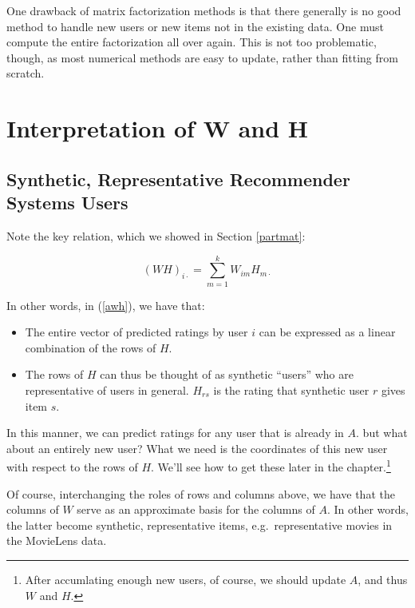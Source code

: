 One drawback of matrix factorization methods is that there generally is
no good method to handle new users or new items not in the existing
data.  One must compute the entire factorization all over again.  This
is not too problematic, though, as most numerical methods are easy to
update, rather than fitting from scratch.

\section{Interpretation of W and H}

\subsection{Synthetic, Representative Recommender Systems Users}
\label{synth}

Note the key relation, which we showed in Section \ref{partmat}:

\begin{equation}
(WH)_{i \cdot} = \sum_{m=1}^k W_{im} H_{m \cdot}
\end{equation}

In other words, in (\ref{awh}), we have that:

\begin{itemize}

\item The entire vector of predicted ratings by user $i$ can be
expressed as a linear combination of the rows of $H$.


\item The rows of $H$ can thus be thought of as synthetic
``users'' who are representative of users in general.  $H_{rs}$ is the
rating that synthetic user $r$ gives item $s$.

\end{itemize} 

In this manner, we can predict ratings for any user that is already in
$A$.  but what about an entirely new user?  What we need is the
coordinates of this new user with respect to the rows of $H$.  We'll see
how to get these later in the chapter.\footnote{After accumlating enough
new users, of course, we should update $A$, and thus $W$ and $H$.}

Of course, interchanging the roles of rows and columns above, we have
that the columns of $W$ serve as an approximate basis for the columns of
$A$.  In other words, the latter become synthetic, representative items,
e.g.\ representative movies in the MovieLens data.

